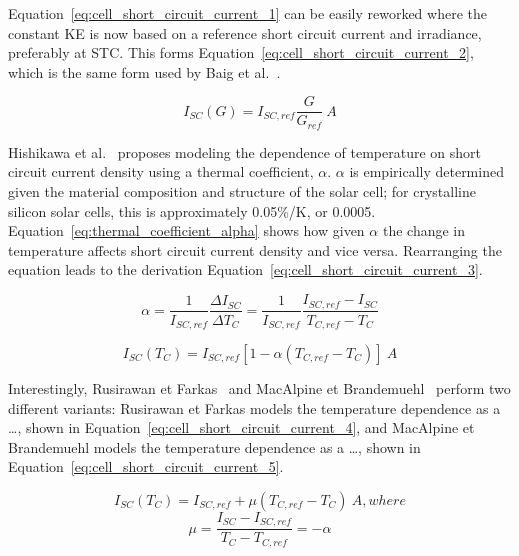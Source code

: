 Equation~\ref{eq:cell_short_circuit_current_1} can be easily reworked where the
constant \ac{KE} is now based on a reference short circuit current and
irradiance, preferably at \ac{STC}. This forms
Equation~\ref{eq:cell_short_circuit_current_2}, which is the same form used by
Baig et al.~\cite{baig_et_al}.

\begin{equation}
    I_{SC}(G) = I_{SC,ref}\frac{G}{G_{ref}}~A
    \label{eq:cell_short_circuit_current_2}
\end{equation}

Hishikawa et al.~\cite{hishikawa_et_al} proposes modeling the dependence of
temperature on short circuit current density using a thermal coefficient,
$\alpha$. $\alpha$ is empirically determined given the material composition and
structure of the solar cell; for crystalline silicon solar cells, this is
approximately 0.05\%/K, or 0.0005. Equation~\ref{eq:thermal_coefficient_alpha}
shows how given $\alpha$ the change in temperature affects short circuit current
density and vice versa. Rearranging the equation leads to the derivation
Equation~\ref{eq:cell_short_circuit_current_3}.

\begin{equation}
    \alpha = \frac{1}{I_{SC,ref}}\frac{\Delta I_{SC}}{\Delta T_C} = \frac{1}{I_{SC,ref}}\frac{I_{SC,ref} - I_{SC}}{T_{C,ref} - T_C}
    \label{eq:thermal_coefficient_alpha}
\end{equation}

\begin{equation}
    I_{SC}(T_C) = I_{SC,ref}[1 - \alpha(T_{C,ref} - T_C)]~A
    \label{eq:cell_short_circuit_current_3}
\end{equation}

Interestingly, Rusirawan et Farkas~\cite{rusirawan_et_farkas} and MacAlpine et
Brandemuehl~\cite{macalpine_et_brandemuehl} perform two different variants:
Rusirawan et Farkas models the temperature dependence as a
\dots, shown in
Equation~\ref{eq:cell_short_circuit_current_4}, and MacAlpine et Brandemuehl
models the temperature dependence as a \dots, shown in
Equation~\ref{eq:cell_short_circuit_current_5}.

\begin{equation}
    I_{SC}(T_C) = I_{SC,ref}+\mu(T_{C,ref} - T_C)~A, where
    \label{eq:cell_short_circuit_current_4}
\end{equation}
\begin{equation}
    \mu = \frac{I_{SC} - I_{SC,ref}}{T_C - T_{C,ref}} = -\alpha
\end{equation}

